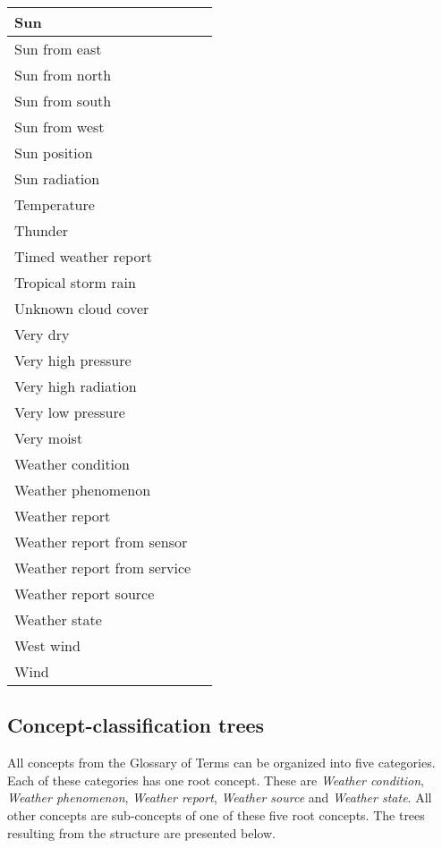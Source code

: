 \begin{longtable}{|p{}|p{}|}
  \hline
  Sun & \\
  \hline
  Sun from east & \\
  \hline
  Sun from north & \\
  \hline
  Sun from south & \\
  \hline
  Sun from west & \\
  \hline
  Sun position & \\
  \hline
  Sun radiation & \\
  \hline
  Temperature & \\
  \hline
  Thunder & \\
  \hline
  Timed weather report & \\
  \hline
  Tropical storm rain & \\
  \hline
  Unknown cloud cover & \\
  \hline
  Very dry & \\
  \hline
  Very high pressure & \\
  \hline
  Very high radiation & \\
  \hline
  Very low pressure & \\
  \hline
  Very moist & \\
  \hline
  Weather condition & \\
  \hline
  Weather phenomenon & \\
  \hline
  Weather report & \\
  \hline
  Weather report from sensor & \\
  \hline
  Weather report from service & \\
  \hline
  Weather report source & \\
  \hline
  Weather state & \\
  \hline
  West wind & \\
  \hline
  Wind & \\
  \hline
\end{longtable}

\subsection{Concept-classification trees}
\label{sec:concept_classification_trees}

All concepts from the Glossary of Terms can be organized into five categories. Each of these categories has one root concept. These are \emph{Weather condition}, \emph{Weather phenomenon}, \emph{Weather report}, \emph{Weather source} and \emph{Weather state}. All other concepts are sub-concepts of one of these five root concepts. The trees resulting from the structure are presented below.

